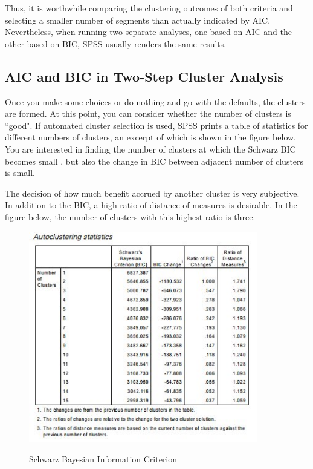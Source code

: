 \documentclass[a4paper,12pt]{article}
\begin{document}
Thus, it is worthwhile comparing the clustering
outcomes of both criteria and selecting a smaller number of segments than
actually indicated by AIC. Nevertheless, when running two separate analyses,
one based on AIC and the other based on BIC, SPSS usually renders the same
results.

\subsection{AIC and BIC in Two-Step Cluster Analysis}






Once you make some choices or do nothing and go with the defaults, the clusters are
formed. At this point, you can consider whether the number of clusters is ``good". If
automated cluster selection is used, SPSS prints a table of statistics for different
numbers of clusters, an excerpt of which is shown in the figure below. You are interested
in finding the number of clusters at which the Schwarz BIC becomes small , but also the change in BIC between
adjacent number of clusters is small. 

The decision of how much benefit accrued by another cluster is very subjective. In addition to the BIC, a high ratio of distance of measures is desirable. In the figure below, the number of clusters with this highest ratio is three.

\begin{figure}[h!]
	\begin{centering}
		\includegraphics[width=10cm]{images/TwoStep1.jpg}\\
		\caption{Schwarz Bayesian Information Criterion}
	\end{centering}
\end{figure}



\end{document}
